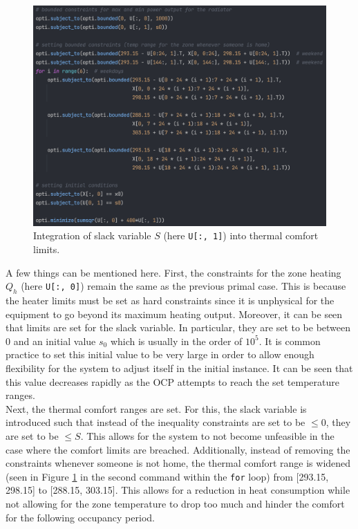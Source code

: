 \begin{figure}[H]
\centering
\includegraphics[width=\textwidth]{images/relaxed_mpc_st.png}
\caption{Integration of slack variable $S$ (here \texttt{U[:, 1]}) into thermal comfort limits.}
\label{fig:relaxed_mpc_st}
\end{figure}

A few things can be mentioned here. First, the constraints for the zone heating $Q_h$ (here \texttt{U[:, 0]}) remain the same as the previous primal case. This is because the heater limits must be set as hard constraints since it is unphysical for the equipment to go beyond its maximum heating output. Moreover, it can be seen that limits are set for the slack variable. In particular, they are set to be between 0 and an initial value $s_0$ which is usually in the order of $10^5$. It is common practice to set this initial value to be very large in order to allow enough flexibility for the system to adjust itself in the initial instance. It can be seen that this value decreases rapidly as the OCP attempts to reach the set temperature ranges. \\

Next, the thermal comfort ranges are set. For this, the slack variable is introduced such that instead of the inequality constraints are set to be $\leq 0$, they are set to be $\leq S$. This allows for the system to not become unfeasible in the case where the comfort limits are breached. Additionally, instead of removing the constraints whenever someone is not home, the thermal comfort range is widened (seen in Figure \ref{fig:relaxed_mpc_st} in the second command within the \texttt{for} loop) from [293.15, 298.15] to [288.15, 303.15]. This allows for a reduction in heat consumption while not allowing for the zone temperature to drop too much and hinder the comfort for the following occupancy period.\\


